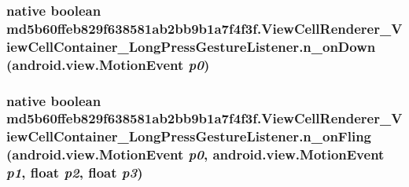 \hypertarget{classmd5b60ffeb829f638581ab2bb9b1a7f4f3f_1_1_view_cell_renderer___view_cell_container___long_press_gesture_listener_0c2331a1c29c5b49fe34d21d92366186}{
\subsubsection[{n\_\-onDown}]{\setlength{\rightskip}{0pt plus 5cm}native boolean md5b60ffeb829f638581ab2bb9b1a7f4f3f.ViewCellRenderer\_\-ViewCellContainer\_\-LongPressGestureListener.n\_\-onDown (android.view.MotionEvent {\em p0})}}
\label{classmd5b60ffeb829f638581ab2bb9b1a7f4f3f_1_1_view_cell_renderer___view_cell_container___long_press_gesture_listener_0c2331a1c29c5b49fe34d21d92366186}


\hypertarget{classmd5b60ffeb829f638581ab2bb9b1a7f4f3f_1_1_view_cell_renderer___view_cell_container___long_press_gesture_listener_5035021054b194d16ae3bd18d55648b3}{
\subsubsection[{n\_\-onFling}]{\setlength{\rightskip}{0pt plus 5cm}native boolean md5b60ffeb829f638581ab2bb9b1a7f4f3f.ViewCellRenderer\_\-ViewCellContainer\_\-LongPressGestureListener.n\_\-onFling (android.view.MotionEvent {\em p0}, \/  android.view.MotionEvent {\em p1}, \/  float {\em p2}, \/  float {\em p3})}}
\label{classmd5b60ffeb829f638581ab2bb9b1a7f4f3f_1_1_view_cell_renderer___view_cell_container___long_press_gesture_listener_5035021054b194d16ae3bd18d55648b3}


